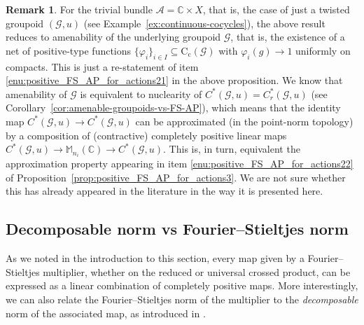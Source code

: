 \documentclass[11 pt, leqno]{amsart}
\numberwithin{equation}{section}
\theoremstyle{plain}
\theoremstyle{definition}
\newtheorem {rem} [thm]{Remark}
\newcommand{\Mat}{\mathbb M} %
\newcommand*{\contc}{\mathrm{C_c}}%
\newcommand{\G}{\mathcal G} %
\newcommand{\A}{\mathcal A}
\newcommand{\C}{\mathbb C}
\newcommand{\N}{\mathbb N}
\begin{document}
\begin{rem}
For the trivial bundle $\A=\C\times X$, that is, the case of just a twisted groupoid $(\G,u)$ (see Example~\ref{ex:continuous-cocycles}), the above result reduces to amenability of the underlying groupoid $\G$, that is, the existence of a net of positive-type functions $\{\varphi_i\}_{i\in I}\subseteq \contc(\G)$ with $\varphi_i(g)\to 1$ uniformly on compacts. 
This is just a re-statement of item \ref{enu:positive_FS_AP_for_actions21} in the above proposition. 
We know that amenability of $\G$ is equivalent to nuclearity of $C^*(\G,u)=C^*_r(\G,u)$ (see Corollary~\ref{cor:amenable-groupoids-vs-FS-AP}), which means that the identity map $C^*(\G,u)\to C^*(\G,u)$ can be approximated (in the point-norm topology) by a composition of (contractive) completely positive linear maps $C^*(\G,u)\to \Mat_{n_i}(\C)\to C^*(\G,u)$. 
This is, in turn, equivalent the approximation property appearing in item \ref{enu:positive_FS_AP_for_actions22} of Proposition~\ref{prop:positive_FS_AP_for_actions3}. 
We are not sure whether this has already appeared in the literature in the way it is presented here.
\end{rem}


%
\subsection{Decomposable norm vs Fourier--Stieltjes norm}
\label{Section:matrices}

As we noted in the introduction to this section, every map given by a Fourier--Stieltjes multiplier, whether on the reduced or universal crossed product, can be expressed as a linear combination of completely positive maps. 
More interestingly, we can also relate the Fourier--Stieltjes norm of the multiplier to the \emph{decomposable} norm of the associated map, as introduced in \cite{Haagerupdec}. 
\end{document}

